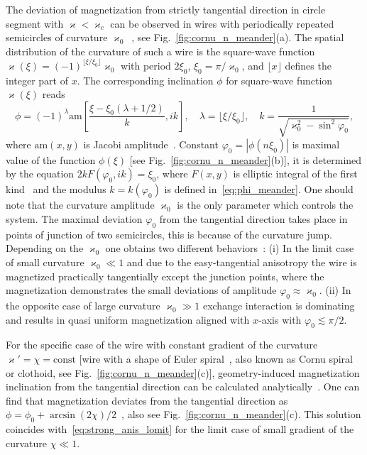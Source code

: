 \documentclass[runningheads]{llncs}
\begin{document}
The deviation of magnetization from  strictly tangential direction in circle segment with $\varkappa<\varkappa_c$ can be observed in wires with periodically repeated semicircles of curvature $\varkappa_0$~\cite{Korniienko19b}, see Fig.~\ref{fig:cornu_n_meander}(a). The spatial distribution of the curvature of such a wire is the square-wave function $\varkappa(\xi) = (-1)^{\lfloor\xi/\xi_0\rfloor}\varkappa_0$ with period $2\xi_0$, $\xi_0=\pi/\varkappa_0$, and $\lfloor x \rfloor$ defines the integer part of $x$. The corresponding inclination $\phi$ for square-wave function $\varkappa(\xi)$ reads~\cite{Korniienko19b}
\begin{equation}\label{eq:phi_meander}
\phi = (-1)^\lambda \text{am}\left[\frac{\xi-\xi_0\left(\lambda+1/2\right)}{k},ik\right],\quad \lambda=\lfloor \xi/\xi_0 \rfloor,\quad k=\frac{1}{\sqrt{\varkappa_0^2-\sin^2\varphi_0}},
\end{equation}
where $\text{am}\left(x,y\right)$ is Jacobi amplitude~\cite{NIST10}. Constant $\varphi_0=|\phi\left(n\xi_0\right)|$ is maximal value of the function $\phi(\xi)$ [see Fig.~\ref{fig:cornu_n_meander}(b)], it is determined by the equation $2kF(\varphi_0,ik) = \xi_0$, where $F(x,y)$ is elliptic integral of the first kind~\cite{NIST10} and the modulus $k = k(\varphi_0)$ is defined in~\eqref{eq:phi_meander}. One should note that the curvature amplitude $\varkappa_0$ is the only parameter which controls the system. The maximal deviation $\varphi_0$ from the tangential direction takes place in points of junction of two semicircles, this is because of the curvature jump. Depending on the $\varkappa_0$ one obtains two different behaviors~\cite{Korniienko19b}: (i) In the limit case of small curvature $\varkappa_0\ll1$ and due to the easy-tangential anisotropy the wire is magnetized practically tangentially except the junction points, where the magnetization demonstrates the small deviations of amplitude $\varphi_0\approx\varkappa_0$. (ii) In the opposite case of large curvature $\varkappa_0\gg1$ exchange interaction is dominating and results in quasi uniform magnetization aligned with $x$-axis with $\varphi_0\lesssim\pi/2$.

For the specific case of the wire with constant gradient of the curvature $\varkappa'=\chi=\text{const}$ [wire with a shape of Euler spiral~\cite{Lawrence14}, also known as Cornu spiral or clothoid, see Fig.~\ref{fig:cornu_n_meander}(c)], geometry-induced magnetization inclination from the tangential direction can be calculated analytically~\cite{Yershov18a}. One can find that magnetization deviates from the tangential direction as $\phi=\phi_0+\arcsin(2\chi)/2$~\cite{Yershov18a}, also see Fig.~\ref{fig:cornu_n_meander}(c). This solution coincides with~\eqref{eq:strong_anis_lomit} for the limit case of small gradient of the curvature $\chi\ll1$. 
\end{document}
